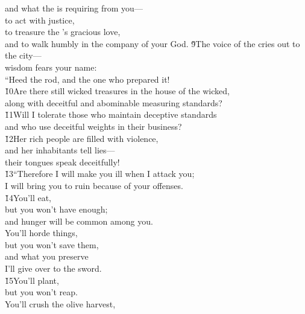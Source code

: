 \begin{poetry}
\poemll    and what the  is requiring from you--- \\
\poeml to act with justice, \\
\poemll    to treasure the 's gracious love, \\
\poemlll       and to walk humbly in the company of your God.
\poeml \v{9}The voice of the  cries out to the city--- \\
\poemll    wisdom fears your name: \\
\poemlll       ``Heed the rod, and the one who prepared it! \\
\poeml \v{10}Are there still wicked treasures in the house of the wicked, \\
\poemll    along with deceitful and abominable measuring standards? \\
\poeml \v{11}Will I tolerate those who maintain deceptive standards \\
\poemll    and who use deceitful weights in their business? \\
\poeml \v{12}Her rich people are filled with violence, \\
\poemll    and her inhabitants tell lies--- \\
\poemlll       their tongues speak deceitfully! \\
\poeml \v{13}``Therefore I will make you ill when I attack you; \\
\poemll    I will bring you to ruin because of your offenses. \\
\poeml \v{14}You'll eat, \\
\poemll    but you won't have enough; \\
\poemlll       and hunger will be common among you. \\
\poeml You'll horde things, \\
\poemll    but you won't save them, \\
\poeml and what you preserve \\
\poemll    I'll give over to the sword. \\
\poeml \v{15}You'll plant, \\
\poemll    but you won't reap. \\
\poeml You'll crush the olive harvest, \\

\end{poetry}
